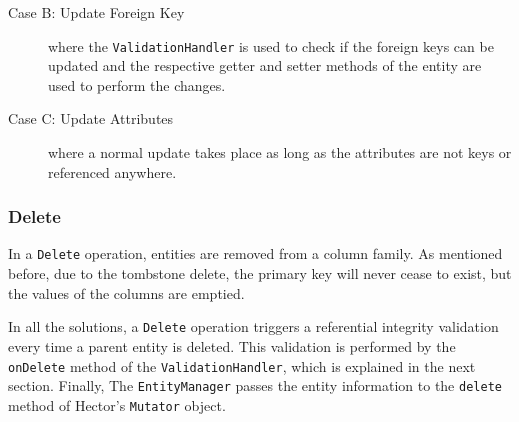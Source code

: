 \begin{description}
		
		
			\item [Case B: Update  Foreign Key]  where  the \texttt{ValidationHandler}
			is used to check if the foreign keys can be updated and
			the respective getter and setter methods of the entity are used to perform the
			changes. 
			
			\item [Case C: Update Attributes]  where a normal update takes place as long as
			the attributes  are not keys or referenced anywhere.
			
		\end{description}
		
		
% 		
% 		 
		
		
		\subsubsection{Delete}\label{ss:delete}
		In a  \texttt{Delete} operation,  entities are removed from a column
		family.  As mentioned before,  due to the tombstone delete,  the primary key
		will never cease to exist,  but the values of the columns are emptied.  
		
		In all the solutions,   a \texttt{Delete} operation triggers a referential
		integrity validation every time a parent entity is deleted.   This validation is
		performed by the \texttt{onDelete} method of the \texttt{ValidationHandler}, 
		which is explained in the next section.   Finally,  The  \texttt{EntityManager}
		passes the entity information to the \texttt{delete} method of Hector's
		\texttt{Mutator} object. 
 		
		
